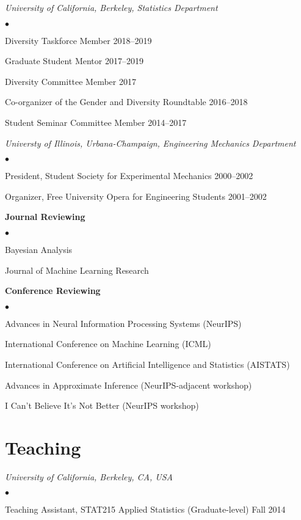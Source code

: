 \documentclass[margin,line]{res}
\newenvironment{list2}{
  \begin{list}{$\bullet$}{%
      \setlength{\itemsep}{0in}
      \setlength{\parsep}{0in} \setlength{\parskip}{0in}
      \setlength{\topsep}{0in} \setlength{\partopsep}{0in}
      \setlength{\leftmargin}{0.2in}}}{\end{list}}
\begin{document}
\begin{resume}
{\em University of California, Berkeley, Statistics Department}
\begin{list2}
    \item Diversity Taskforce Member \hfill 2018--2019
    \item Graduate Student Mentor \hfill 2017--2019
    \item Diversity Committee Member  \hfill 2017
    \item Co-organizer of the Gender and Diversity Roundtable \hfill 2016--2018
    \item Student Seminar Committee Member \hfill 2014--2017
\end{list2}

{\em Universty of Illinois, Urbana-Champaign, Engineering Mechanics Department}
\begin{list2}
    \item President, Student Society for Experimental Mechanics \hfill 2000--2002
    \item Organizer, Free University Opera for Engineering Students \hfill 2001--2002
\end{list2}


\textbf{Journal Reviewing}
\begin{list2}
\item Bayesian Analysis
\item Journal of Machine Learning Research
\end{list2}

\textbf{Conference Reviewing}
\begin{list2}
\item Advances in Neural Information Processing Systems (NeurIPS)
\item International Conference on Machine Learning (ICML)
\item International Conference on Artificial Intelligence and Statistics (AISTATS)
\item Advances in Approximate Inference (NeurIPS-adjacent workshop)
\item I Can't Believe It's Not Better (NeurIPS workshop)
\end{list2}


\section{\sc Teaching}

\emph{University of California, Berkeley, CA, USA}
\begin{list2}
\item Teaching Assistant, STAT215 Applied Statistics
(Graduate-level) \hfill Fall 2014
\end{list2}


\end{resume}
\end{document}
